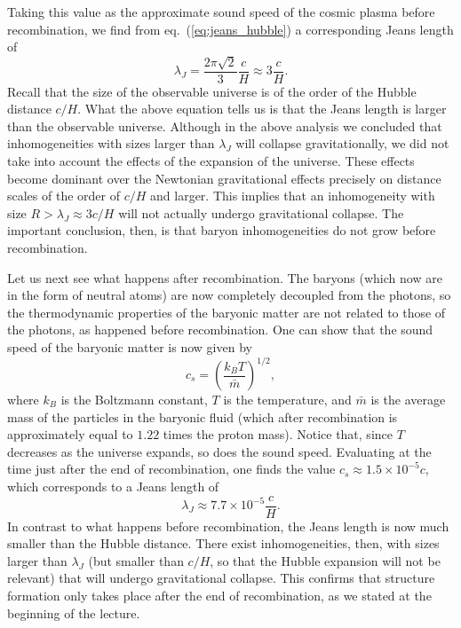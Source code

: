 \documentclass[11pt, a4paper,oneside,openright]{book}
\numberwithin{equation}{section}
\begin{document}
Taking this value as the approximate sound speed of the cosmic plasma before recombination, we find from eq.\ (\ref{eq:jeans_hubble}) a corresponding Jeans length of
\begin{equation}
\lambda_J= \frac{2\pi\sqrt{2}}{3}\frac{c}{H}\approx 3\frac{c}{H}.
\end{equation}
Recall that the size of the observable universe is of the order of the Hubble distance $c/H$. What the above equation tells us is that the Jeans length is larger than the observable universe. Although in the above analysis we concluded that inhomogeneities with sizes larger than $\lambda_J$ will collapse gravitationally, we did not take into account the effects of the expansion of the universe. These effects become dominant over the Newtonian gravitational effects precisely on distance scales of the order of $c/H$ and larger. This implies that an inhomogeneity with size $R>\lambda_J\approx 3c/H$ will not actually undergo gravitational collapse. The important conclusion, then, is that baryon inhomogeneities do not grow before recombination.

Let us next see what happens after recombination. The baryons (which now are in the form of neutral atoms) are now completely decoupled from the photons, so the thermodynamic properties of the baryonic matter are not related to those of the photons, as happened before recombination. One can show that the sound speed of the baryonic matter is now given by
\begin{equation} \label{eq:sound_speed2}
c_s=\left(\frac{k_B T}{\bar{m}}\right)^{1/2},
\end{equation}
where $k_B$ is the Boltzmann constant, $T$ is the temperature, and $\bar{m}$ is the average mass of the particles in the baryonic fluid (which after recombination is approximately equal to $1.22$ times the proton mass). Notice that, since $T$ decreases as the universe expands, so does the sound speed. Evaluating at the time just after the end of recombination, one finds the value $c_s\approx1.5\times10^{-5}c$, which corresponds to a Jeans length of
\begin{equation}
\lambda_J\approx 7.7\times10^{-5}\frac{c}{H}.
\end{equation}
In contrast to what happens before recombination, the Jeans length is now much smaller than the Hubble distance. There exist inhomogeneities, then, with sizes larger than $\lambda_J$ (but smaller than $c/H$, so that the Hubble expansion will not be relevant) that will undergo gravitational collapse. This confirms that structure formation only takes place after the end of recombination, as we stated at the beginning of the lecture.
\end{document}
